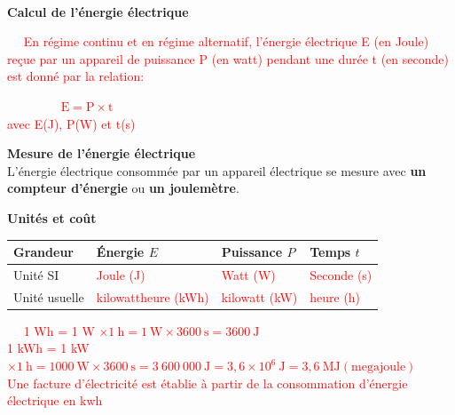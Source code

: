 \documentclass[11pt,a4paper]{article}
\newcommand{\ctext}[1]
{\begin{bclogo}[couleur = white,logo= , arrondi = 0.1,barre=none]
{}
\vspace{-8mm}
~~
\textcolor{red}{#1}
~~
\end{bclogo}}
\newenvironment{itemize*}%
    {\begin{itemize}%
      \setlength{\itemsep}{0pt}%
      \setlength{\parskip}{0pt}}%
    {\end{itemize}}
\begin{document}
\\[-3mm]
\begin{itemize*}
    \item \textbf{Calcul de l'énergie électrique}\\
\noindent%
\begin{minipage}{.67\textwidth}%
    
    \ctext{En régime continu et en régime alternatif, l'énergie électrique E (en Joule) reçue par un appareil de puissance P (en watt) pendant une durée t (en seconde) est donné par la relation:}

\end{minipage}%
\hfill
\begin{minipage}{.25\textwidth}%
\ctext{
     ~~~~~~\LARGE{$\mathrm{E = P\times t}$} \\[3mm]
     \hspace{1cm}\small{avec E(J), P(W) et t(s)} 
}
\end{minipage}%





    \item \textbf{Mesure de l'énergie électrique}\\
    L'énergie électrique consommée par un appareil électrique se mesure avec \textbf{un compteur d'énergie} ou \textbf{un joulemètre}. 
    \item \textbf{Unités et coût}\\
    \vspace{-5mm}\begin{center}
    

    \begin{tabular}{|C{3cm}|C{4cm}|C{3cm}|C{3cm}|}
         \hline
        Grandeur & Énergie $E$ & Puissance $P$ & Temps $t$\\
         \hline
        Unité SI & \textcolor{red}{Joule (J)} & \textcolor{red}{Watt (W)} & \textcolor{red}{Seconde  (s)}  \\
         \hline
         Unité usuelle &  \textcolor{red}{kilowattheure (kWh)}&  \textcolor{red}{kilowatt (kW)}  &  \textcolor{red}{heure (h)}  \\
         \hline
        
    \end{tabular}
    
\vspace{2mm}
\ctext{
1 Wh = 1 W $\mathrm{\times 1~h = 1~W \times 3 600~s  = 3600~J }$ \\
1 kWh = 1 kW $\mathrm{\times 1~h = 1000~W \times 3 600~s  = 3~600~000~J = 3,6 \times 10^{6}~J = 3,6~MJ (megajoule)}$ \\
Une facture d'électricité est établie à partir de la consommation d'énergie électrique en kwh }
\end{center}

\end{itemize*}
\end{document}
